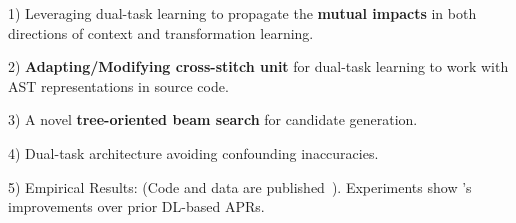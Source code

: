 

1) Leveraging dual-task learning to propagate the {\bf mutual impacts}
  in both directions of context and transformation learning.

2) {\bf Adapting/Modifying cross-stitch unit} for dual-task learning to work
with AST representations in source code.

3) A novel {\bf tree-oriented beam search} for candidate generation.

4) Dual-task architecture avoiding
confounding inaccuracies.




5) Empirical Results: (Code and data are published~\cite{CDFix2022}).
Experiments show {\tool}'s improvements over prior
DL-based APRs.



